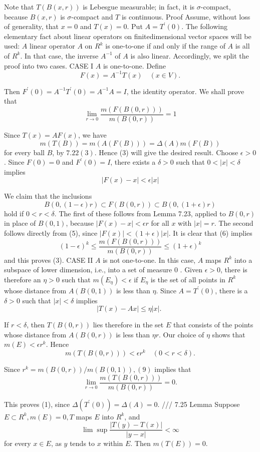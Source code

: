 Note that $T(B(x, r))$ is Lebesgue measurable; in fact, it is $\sigma$-compact, because $B(x, r)$ is $\sigma$-compact and $T$ is continuous.
Proof Assume, without loss of generality, that $x=0$ and $T(x)=0$. Put $A=T^{\prime}(0)$.
The following elementary fact about linear operators on finitedimensional vector spaces will be used: $A$ linear operator $A$ on $R^k$ is one-to-one if and only if the range of $A$ is all of $R^k$. In that case, the inverse $A^{-1}$ of $A$ is also linear.
Accordingly, we split the proof into two cases.
CASE I $A$ is one-to-one. Define
$$
F(x)=A^{-1} T(x) \quad(x \in V) .
$$

Then $F^{\prime}(0)=A^{-1} T^{\prime}(0)=A^{-1} A=I$, the identity operator. We shall prove that
$$
\lim _{r \rightarrow 0} \frac{m(F(B(0, r)))}{m(B(0, r))}=1
$$

Since $T(x)=A F(x)$, we have
$$
m(T(B))=m(A(F(B)))=\Delta(A) m(F(B))
$$
for every ball $B$, by $7.22(3)$. Hence (3) will give the desired result.
Choose $\epsilon>0$. Since $F(0)=0$ and $F^{\prime}(0)=I$, there exists a $\delta>0$ such that $0<|x|<\delta$ implies
$$
|F(x)-x|<\epsilon|x|
$$

We claim that the inclusions
$$
B(0,(1-\epsilon) r) \subset F(B(0, r)) \subset B(0,(1+\epsilon) r)
$$
hold if $0<r<\delta$. The first of these follows from Lemma 7.23, applied to $B(0, r)$ in place of $B(0,1)$, because $|F(x)-x|<\epsilon r$ for all $x$ with $|x|=r$. The second follows directly from (5), since $|F(x)|<(1+\epsilon)|x|$. It is clear that (6) implies
$$
(1-\epsilon)^k \leq \frac{m(F(B(0, r)))}{m(B(0, r))} \leq(1+\epsilon)^k
$$
and this proves (3).
CASE II $A$ is not one-to-one. In this case, $A$ maps $R^k$ into a subspace of lower dimension, i.e., into a set of measure 0 . Given $\epsilon>0$, there is therefore an $\eta>0$ such that $m\left(E_\eta\right)<\epsilon$ if $E_\eta$ is the set of all points in $R^k$ whose distance from $A(B(0,1))$ is less than $\eta$. Since $A=T^{\prime}(0)$, there is a $\delta>0$ such that $|x|<\delta$ implies
$$
|T(x)-A x| \leq \eta|x| \text {. }
$$

If $r<\delta$, then $T(B(0, r))$ lies therefore in the set $E$ that consists of the points whose distance from $A(B(0, r))$ is less than $\eta r$. Our choice of $\eta$ shows that $m(E)<\epsilon r^k$. Hence
$$
m(T(B(0, r)))<\epsilon r^k \quad(0<r<\delta) .
$$

Since $r^k=m(B(0, r)) / m(B(0,1)),(9)$ implies that
$$
\lim _{r \rightarrow 0} \frac{m(T(B(0, r)))}{m(B(0, r))}=0 .
$$

This proves (1), since $\Delta\left(T^{\prime}(0)\right)=\Delta(A)=0$.
///
7.25 Lemma Suppose $E \subset R^k, m(E)=0, T$ maps $E$ into $R^k$, and
$$
\lim \sup \frac{|T(y)-T(x)|}{|y-x|}<\infty
$$
for every $x \in E$, as $y$ tends to $x$ within $E$.
Then $m(T(E))=0$.

